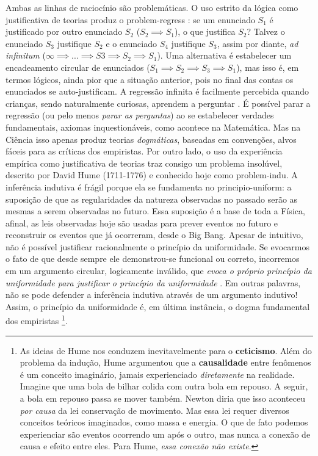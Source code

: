 \documentclass[./main.tex]{subfiles}
\begin{document}
\par Ambas as linhas de raciocínio são problemáticas. O uso estrito da lógica como justificativa de teorias produz o \gls{problem-regress} \cite{cling2008}: se um enunciado $S_1$ é justificado por outro enunciado $S_2$ ($S_2 \implies S_1$), o que justifica $S_2$? Talvez o enunciado $S_3$ justifique $S_2$ e o enunciado $S_4$ justifique $S_3$, assim por diante, \textit{ad infinitum} ($\infty \implies ... \implies S3 \implies S_2 \implies S_1$). Uma alternativa é estabelecer um encadeamento circular de enunciados  ($S_1 \implies S_2 \implies S_3 \implies S_1$), mas isso é, em termos lógicos, ainda pior que a situação anterior, pois no final das contas os enunciados se auto-justificam. A regressão infinita é facilmente percebida quando crianças, sendo naturalmente curiosas, aprendem a perguntar . É possível parar a regressão (ou pelo menos \textit{parar as perguntas}) ao se estabelecer verdades fundamentais, axiomas inquestionáveis, como acontece na Matemática. Mas na Ciência isso apenas produz teorias \textit{dogmáticas}, baseadas em convenções, alvos fáceis para as críticas dos empiristas. Por outro lado, o uso da experiência empírica como justificativa de teorias traz consigo um problema insolúvel, descrito por David Hume (1711-1776) e conhecido hoje como \gls{problem-indu}. A inferência indutiva é frágil porque ela se fundamenta no \gls{principio-uniform}: a suposição de que as regularidades da natureza observadas no passado serão as mesmas a serem observadas no futuro. Essa suposição é a base de toda a Física, afinal, as leis observadas hoje são usadas para prever eventos no futuro e reconstruir os eventos que já ocorreram, desde o Big Bang. Apesar de intuitivo, não é possível justificar racionalmente o princípio da uniformidade. Se evocarmos o fato de que desde sempre ele demonstrou-se funcional ou correto, incorremos em um argumento circular, logicamente inválido, que \textit{evoca o próprio princípio da uniformidade para justificar o princípio da uniformidade} \cite{sep-induction-problem}. Em outras palavras, não se pode defender a inferência indutiva através de um argumento indutivo! Assim, o princípio da uniformidade é, em última instância, o dogma fundamental dos empiristas \footnote{As ideias de Hume nos conduzem inevitavelmente para o \textbf{ceticismo}. Além do problema da indução, Hume argumentou que a \textbf{causalidade} entre fenômenos é um conceito imaginário, jamais experienciado \textit{diretamente} na realidade. Imagine que uma bola de bilhar colida com outra bola em repouso. A seguir, a bola em repouso passa se mover também. Newton diria que isso aconteceu \textit{por causa} da lei conservação de movimento. Mas essa lei requer diversos conceitos teóricos imaginados, como massa e energia. O que de fato podemos experienciar são eventos ocorrendo um após o outro, mas nunca a conexão de causa e efeito entre eles. Para Hume, \textit{essa conexão não existe}. }.    
\end{document}

